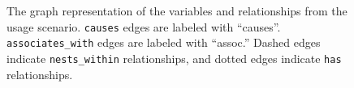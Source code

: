 {\begin{figure}[h]
%
%
%
        \caption{The graph representation of the variables and relationships from the usage scenario. \texttt{causes} edges are labeled with ``causes''. \texttt{associates\_with} edges are labeled with ``assoc.'' Dashed edges indicate \texttt{nests\_within} relationships, and dotted edges indicate \texttt{has} relationships.}
        \label{fig:figureGraphIRExample}

\end{figure}}
